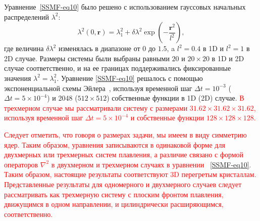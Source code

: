 Уравнение~\eqref{SSMF-eq10} было решено с использованием гауссовых начальных распределений $ \lambda ^ 2$:
\begin{equation}
\label{SSMF-eq11}
\lambda^2(0, \mathbf{r}) = \lambda^2_1 + \delta\lambda^2 \exp\left(-\frac{\mathbf{r}^2}{l^2}\right),
\end{equation}
где величина $ \delta\lambda^2$ изменялась в диапазоне от $ 0 $ до $ 1.5 $, a $ l ^ 2 = 0.4 $ в 1D и $ l ^ 2 = 1 $ в 2D случае.
Размеры системы были выбраны равными $20$ и $20 \times 20 $ в 1D и 2D случае соответственно, и на ее границах поддерживались фиксированные значения $\lambda^2= \lambda_1 ^ 2 $.
Уравнение \eqref{SSMF-eq10} решалось с помощью экспоненциальной схемы Эйлера~\cite{10.1098/rspa.2008.0325}, используя временной шаг $\Delta t=10^{-3}$ ($\Delta t=5\times10^{-4}$) и
2048 ($512\times512$) собственные функции в 1D (2D) случае. \textcolor{red}{В трехмерном случае мы рассматривали систему с размерами $31.62 \times 31.62 \times 31.62$, используя временной шаг $\Delta t = 5 \times 10 ^ {-4}$ и собственные функции $128 \times 128 \times 128 $.}

\textcolor{red}{Следует отметить, что говоря о размерах задачи, мы имеем в виду симметрию ядер. Таким образом, уравнения записываются в одинаковой форме для двухмерных или трехмерных систем плавления, а различие связано с формой операторов $\nabla ^ 2$ в двухмерном и трехмерном случаях в уравнении ~\eqref{SSMF-eq10}. Таким образом, настоящие результаты соответствуют 3D перегретым кристаллам. Представленные результаты для одномерного и двухмерного случаев следует рассматривать как трехмерную систему с плоским фронтом плавления, движущимся в одном направлении, и цилиндрически расширяющимся, соответственно.}

